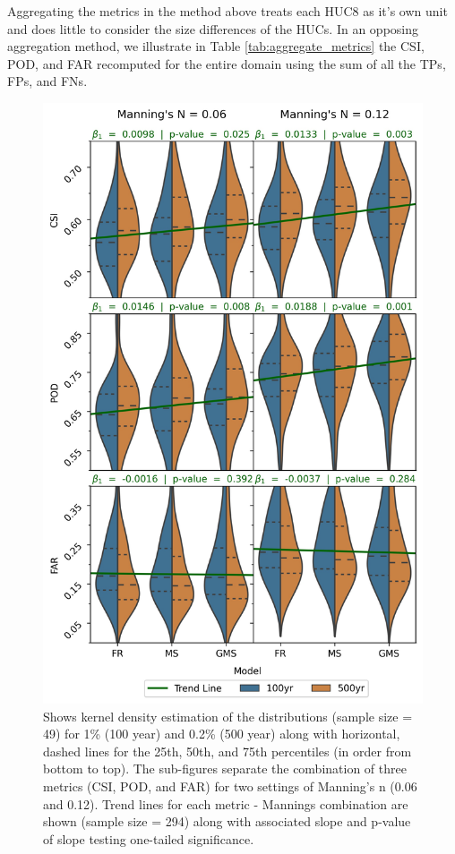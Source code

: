 \documentclass[draft]{dependencies/agujournal2019}
\begin{document}
Aggregating the metrics in the method above treats each HUC8 as it's own unit and does little to consider the size differences of the HUCs. 
In an opposing aggregation method, we illustrate in Table \ref{tab:aggregate_metrics}  the CSI, POD, and FAR recomputed for the entire domain using the sum of all the TPs, FPs, and FNs. 
%
\begin{figure}[h!]
\centering
\includegraphics[scale=0.9]{figures/violin_plots.jpg}
\caption{Shows kernel density estimation of the distributions (sample size = 49) for 1\% (100 year) and 0.2\% (500 year) along with horizontal, dashed lines for the 25th, 50th, and 75th percentiles (in order from bottom to top).
The sub-figures separate the combination of three metrics (CSI, POD, and FAR) for two settings of Manning's n (0.06 and 0.12).
Trend lines for each metric - Mannings combination are shown (sample size = 294) along with associated slope and p-value of slope testing one-tailed significance.}
\label{fig:violin_plot}
\end{figure}
\end{document}
